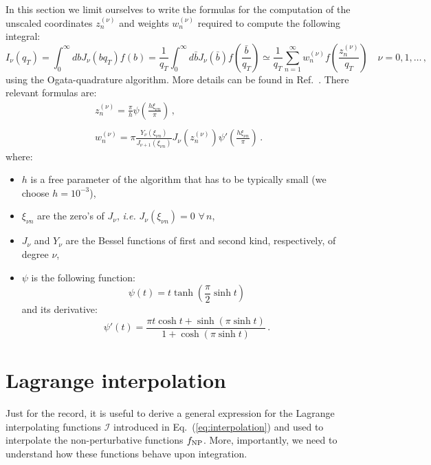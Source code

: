 \documentclass[10pt,a4paper]{article}
\begin{document}
In this section we limit ourselves to write the formulas for the
computation of the unscaled coordinates $z_n^{(\nu)}$ and weights
$w_n^{(\nu)}$ required to compute the following integral:
\begin{equation}\label{eq:OgataQuadMast}
I_\nu(q_T)=\int_0^\infty db J_\nu(bq_T) f\left(b\right) =
\frac1{q_T}\int_0^\infty d\bar{b} J_\nu(\bar{b})
f\left(\frac{\bar{b}}{q_T}\right) \simeq
\frac{1}{q_T}\sum_{n=1}^\infty
w_n^{(\nu)}f\left(\frac{z_n^{(\nu)}}{q_T}\right)\quad \nu =0,1,\dots\,,
\end{equation}
using the Ogata-quadrature algorithm. More details can be found in
Ref.~\cite{Ogata:quadrature}. There relevant formulas are:
\begin{equation}
\begin{array}{l}
\displaystyle z_n^{(\nu)} = \frac{\pi}{h}  \psi\left(\frac{h\xi_{\nu
  n}}{\pi}\right)\,,\\
\\
\displaystyle w_n^{(\nu)}  = \pi\frac{Y_\nu(\xi_{\nu
  n})}{J_{\nu+1}(\xi_{\nu n})}  J_\nu(z_n^{(\nu)})  \psi'\left(\frac{h\xi_{\nu
  n}}{\pi}\right)\,.
\end{array}
\end{equation}
where:
\begin{itemize}
\item $h$ is a free parameter of the algorithm that has to be
  typically small (we choose $h = 10^{-3}$),
\item $\xi_{\nu n}$ are the zero's of $J_\nu$, \textit{i.e.}
  $J_\nu(\xi_{\nu n}) = 0$ $\forall\, n$,
\item $J_\nu$ and $Y_\nu$ are the Bessel functions of first and second
  kind, respectively, of degree $\nu$,
\item $\psi$ is the following function:
\begin{equation}
\psi(t) = t\tanh\left(\frac{\pi}{2}\sinh t\right)
\end{equation}
and its derivative:
\begin{equation}
\psi'(t) =  \frac{\pi t \cosh t + \sinh( \pi \sinh t ) }{1 +
  \cosh( \pi \sinh t  ) }\,.
\end{equation}
\end{itemize}

\section{Lagrange interpolation}\label{app:LagrangeInterpolation}

Just for the record, it is useful to derive a general expression for
the Lagrange interpolating functions $\mathcal{I}$ introduced in
Eq.~(\ref{eq:interpolation}) and used to interpolate the
non-perturbative functions $f_{\rm NP}$. More, importantly, we need to
understand how these functions behave upon integration.
\end{document}
